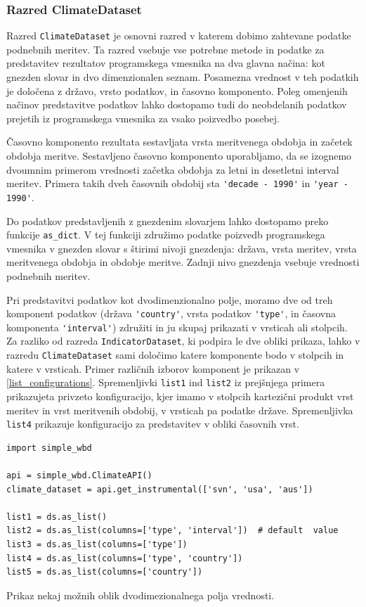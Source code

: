 \subsubsection{Razred ClimateDataset}

Razred \verb|ClimateDataset| je osnovni razred v katerem dobimo zahtevane 
podatke podnebnih meritev. Ta razred vsebuje vse potrebne metode in podatke za 
predstavitev rezultatov programskega vmesnika na dva glavna načina: kot
gnezden slovar in dvo dimenzionalen seznam. Posamezna vrednost v teh podatkih
je določena z državo, vrsto podatkov, in časovno komponento. Poleg omenjenih
načinov predstavitve podatkov lahko dostopamo tudi do neobdelanih podatkov 
prejetih iz programskega vmesnika za vsako poizvedbo posebej.

Časovno komponento rezultata sestavljata vrsta meritvenega obdobja in 
začetek obdobja meritve. Sestavljeno časovno komponento uporabljamo, da se 
izognemo dvoumnim primerom vrednosti začetka obdobja za letni in desetletni 
interval meritev. Primera takih dveh časovnih obdobij sta 
\verb|'decade - 1990'| in \verb|'year - 1990'|.


Do podatkov predstavljenih z gnezdenim slovarjem lahko dostopamo preko funkcije
\verb|as_dict|. V tej funkciji združimo podatke poizvedb programskega
vmesnika v gnezden slovar s štirimi nivoji gnezdenja: država, vrsta meritev,
vrsta meritvenega obdobja in obdobje meritve. Zadnji nivo gnezdenja vsebuje
vrednosti podnebnih meritev.

Pri predstavitvi podatkov kot dvodimenzionalno polje, moramo dve od treh
komponent podatkov (država \verb|'country'|, vrsta podatkov \verb|'type'|, 
in časovna komponenta \verb|'interval'|)
združiti in ju skupaj prikazati v vrsticah ali stolpcih. Za razliko od razreda
\verb|IndicatorDataset|, ki podpira le dve obliki prikaza, lahko v razredu
\verb|ClimateDataset| sami določimo katere komponente bodo v stolpcih in
katere v vrsticah. Primer različnih izborov komponent je prikazan v
\ref{list_configurations}. Spremenljivki \verb|list1| ind \verb|list2| iz
prejšnjega primera prikazujeta privzeto konfiguracijo, kjer imamo v stolpcih
kartezični produkt vrst meritev in vrst meritvenih obdobij, v vrsticah pa
podatke države. Spremenljivka \verb|list4| prikazuje konfiguracijo za
predstavitev v obliki časovnih vrst.

\begin{snippet}
\begin{center}
\begin{lstlisting}
import simple_wbd

api = simple_wbd.ClimateAPI()                   
climate_dataset = api.get_instrumental(['svn', 'usa', 'aus'])

list1 = ds.as_list()
list2 = ds.as_list(columns=['type', 'interval'])  # default  value
list3 = ds.as_list(columns=['type'])
list4 = ds.as_list(columns=['type', 'country']) 
list5 = ds.as_list(columns=['country'])
\end{lstlisting}
\end{center}
\cprotect
\caption{Prikaz nekaj možnih oblik dvodimezionalnega polja vrednosti.} 
\label{list_configurations}
\end{snippet} 



